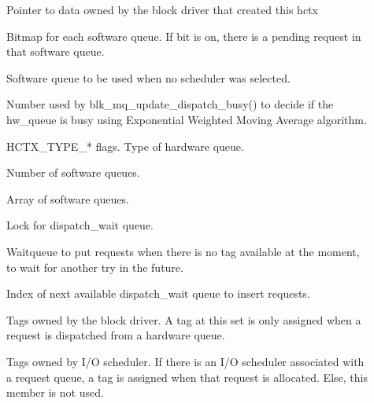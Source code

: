 \documentclass[a4paper,11pt,english]{sphinxmanual}
\begin{document}
\begin{description}
\item[{}] \leavevmode
Pointer to data owned by the block driver that created
this hctx

\item[{}] \leavevmode
Bitmap for each software queue. If bit is on, there is a
pending request in that software queue.

\item[{}] \leavevmode
Software queue to be used when no scheduler was
selected.

\item[{}] \leavevmode
Number used by blk\_mq\_update\_dispatch\_busy() to
decide if the hw\_queue is busy using Exponential Weighted Moving
Average algorithm.

\item[{}] \leavevmode
HCTX\_TYPE\_* flags. Type of hardware queue.

\item[{}] \leavevmode
Number of software queues.

\item[{}] \leavevmode
Array of software queues.

\item[{}] \leavevmode
Lock for dispatch\_wait queue.

\item[{}] \leavevmode
Waitqueue to put requests when there is no tag
available at the moment, to wait for another try in the future.

\item[{}] \leavevmode
Index of next available dispatch\_wait queue to insert
requests.

\item[{}] \leavevmode
Tags owned by the block driver. A tag at this set is only
assigned when a request is dispatched from a hardware queue.

\item[{}] \leavevmode
Tags owned by I/O scheduler. If there is an I/O
scheduler associated with a request queue, a tag is assigned when
that request is allocated. Else, this member is not used.


\end{description}
\end{document}
